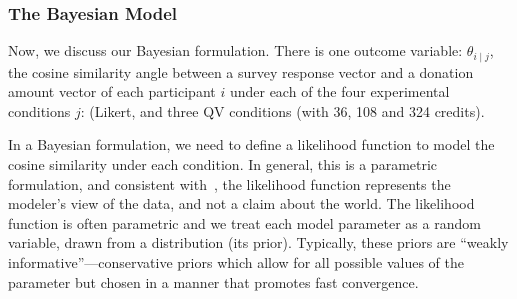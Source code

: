 
\subsubsection{The Bayesian Model}
\label{exp1:The Bayesian Model}



Now, we discuss our Bayesian formulation. There is one outcome variable: $\theta_{i \mid j}$, the cosine similarity angle between a survey response vector and  a donation amount vector of each participant $i$  under each of the four experimental conditions $j$: (Likert, and three QV conditions (with 36, 108 and 324 credits). 

In a Bayesian formulation, we need to define a likelihood function to model the cosine similarity under each condition. In general, this is a parametric formulation, and consistent with~\textcite{McElreath2015}, the likelihood function represents the modeler's view of the data, and not a claim about the world. The likelihood function is often parametric and we treat each model parameter as a random variable, drawn from a distribution (its prior). Typically, these priors are ``weakly informative''---conservative priors which allow for all possible values of the parameter but chosen in a manner that promotes fast convergence.

